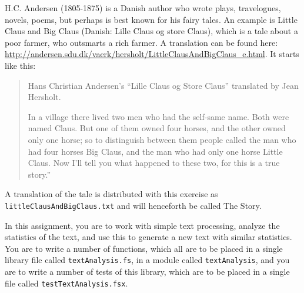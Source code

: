 H.C. Andersen (1805-1875) is a Danish author who wrote plays, travelogues, novels, poems, but perhaps is best known for his fairy tales. An example is Little Claus and Big Claus (Danish: Lille Claus og store Claus), which is a tale about a poor farmer, who outsmarts a rich farmer. A translation can be found here: \url{http://andersen.sdu.dk/vaerk/hersholt/LittleClausAndBigClaus_e.html}. It starts like this:
\begin{quote}
  Hans Christian Andersen's ``Lille Claus og Store Claus'' translated by Jean Hersholt.

In a village there lived two men who had the self-same name. Both were named Claus. But one of them owned four horses, and the other owned only one horse; so to distinguish between them people called the man who had four horses Big Claus, and the man who had only one horse Little Claus. Now I'll tell you what happened to these two, for this is a true story.''
\end{quote}
A translation of the tale is distributed with this exercise as \lstinline[language=console]{littleClausAndBigClaus.txt} and will henceforth be called The Story.


In this assignment, you are to work with simple text processing, analyze the statistics of the text, and use this to generate a new text with similar statistics. You are to write a number of functions, which all are to be placed in a single library file called \lstinline[language=console]{textAnalysis.fs}, in a module called \lstinline[language=console]{textAnalysis}, and you are to write a number of tests of this library, which are to be placed in a single file called \lstinline[language=console]{testTextAnalysis.fsx}.
